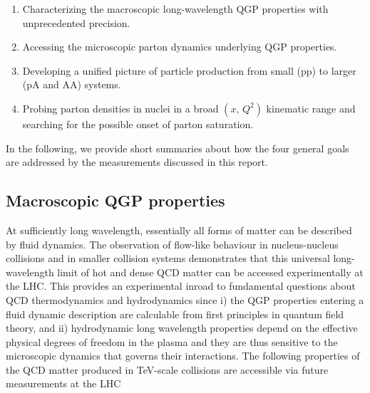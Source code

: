 \documentclass[../report.tex]{subfiles}
\begin{document}
\begin{enumerate}
\item Characterizing the macroscopic long-wavelength QGP properties with unprecedented precision. 
\item Accessing the microscopic parton dynamics underlying QGP properties.
\item Developing a unified picture of particle production from small (pp) to larger (pA and AA) systems.
\item Probing parton densities in nuclei in a broad $(x,\,Q^2)$ kinematic range and searching for the possible onset of parton saturation.
\end{enumerate}
 
In the following, we provide short summaries about how the four general goals are addressed by the measurements discussed in this report.

\subsection{Macroscopic QGP properties}
At sufficiently long wavelength, essentially all forms of matter can be described by fluid dynamics. The observation of flow-like behaviour in nucleus-nucleus collisions and in smaller collision systems demonstrates that this universal long-wavelength limit of hot and dense QCD matter can be accessed experimentally at the LHC. This provides an experimental inroad to fundamental questions about QCD thermodynamics and hydrodynamics since i) the QGP properties entering a fluid dynamic description are calculable from first principles in quantum field theory, and ii) hydrodynamic long wavelength properties depend on the effective physical degrees of freedom in the plasma and they are thus sensitive to the microscopic dynamics that governs their interactions. The following properties of the QCD matter produced in TeV-scale collisions
are accessible via future measurements at the LHC
\end{document}
